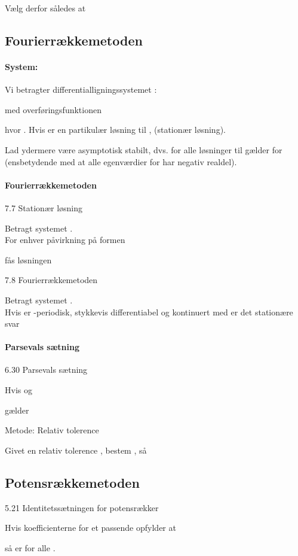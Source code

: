 \documentclass[
]{article}
\begin{document}
Vælg derfor {} således at

\subsection{Fourierrækkemetoden}\label{fourierruxe6kkemetoden}

\paragraph{System:}\label{system}

Vi betragter differentialligningssystemet {}:

med overføringsfunktionen

hvor {}. Hvis {} er {} en partikulær løsning til {}, (stationær
løsning).

Lad ydermere {} være asymptotisk stabilt, dvs. for alle løsninger {} til
{} gælder {} for {} (ensbetydende med at alle egenværdier for {} har
negativ realdel).

\paragraph{Fourierrækkemetoden}\label{fourierruxe6kkemetoden-1}

7.7 Stationær løsning

Betragt systemet {}.\\
For enhver påvirkning på formen

fås løsningen

7.8 Fourierrækkemetoden

Betragt systemet {}.\\
Hvis {} er {}-periodisk, stykkevis differentiabel og kontinuert med {}
er det stationære svar

\paragraph{Parsevals sætning}\label{parsevals-suxe6tning}

6.30 Parsevals sætning

Hvis {} og

gælder

Metode: Relativ tolerence

Givet en relativ tolerence {}, {} bestem {}, så

\subsection{Potensrækkemetoden}\label{potensruxe6kkemetoden}

5.21 Identitetssætningen for potensrækker

Hvis koefficienterne {} for et passende {} opfylder at

så er {} for alle {}.
\end{document}
